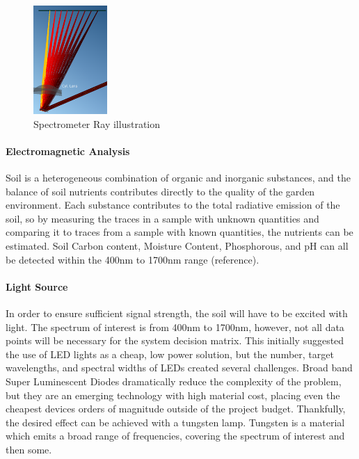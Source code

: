 \begin{figure}[H]
    \caption{Spectrometer Ray illustration}
    \centering
    \includegraphics[width=0.25\textwidth]{images/YuanCaoSpectrometer.png}
\end{figure}


\paragraph{Electromagnetic Analysis} Soil is a heterogeneous combination of organic and inorganic substances, and the balance of soil nutrients contributes directly to the quality of the garden environment. Each substance contributes to the total radiative emission of the soil, so by measuring the traces in a sample with unknown quantities and comparing it to traces from a sample with known quantities, the nutrients can be estimated. Soil Carbon content, Moisture Content, Phosphorous, and pH can all be detected within the 400nm to 1700nm range (reference).

\paragraph{Light Source} In order to ensure sufficient signal strength, the soil will have to be excited with light. The spectrum of interest is from 400nm to 1700nm, however, not all data points will be necessary for the system decision matrix. This initially suggested the use of LED lights as a cheap, low power solution, but the number, target wavelengths, and spectral widths of LEDs created several challenges. Broad band Super Luminescent Diodes dramatically reduce the complexity of the problem, but they are an emerging technology with high material cost, placing even the cheapest devices orders of magnitude outside of the project budget. Thankfully, the desired effect can be achieved with a tungsten lamp. Tungsten is a material which emits a broad range of frequencies, covering the spectrum of interest and then some.

